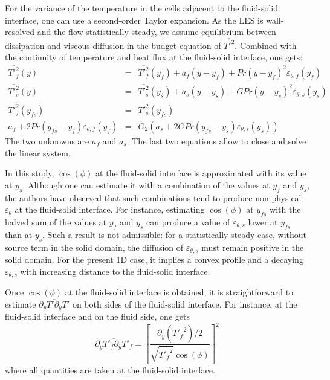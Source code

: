 \documentclass{svjour3}                     %
\begin{document}
For the variance of the temperature in the cells adjacent to the fluid-solid interface, one can use a second-order Taylor expansion.
As the LES is wall-resolved and the flow statistically steady, we assume equilibrium between dissipation and viscous diffusion in the budget equation of $\overline{{T'}^2}$.
Combined with the continuity of temperature and heat flux at the fluid-solid interface, one gets:
\begin{eqnarray}
\overline{{T'}^2_f} \left( y \right) & = & \overline{{T'}^2_f} \left( y_f \right) + a_f \left( y-y_f \right) + Pr \left( y-y_f \right)^2 \varepsilon_{\theta,f} \left( y_f \right) \nonumber \\
\overline{{T'}^2_s} \left( y \right) & = & \overline{{T'}^2_s} \left( y_s \right) + a_s \left( y-y_s \right) + G Pr \left( y-y_s \right)^2 \varepsilon_{\theta,s} \left( y_s \right) \nonumber \\
\overline{{T'}^2_f} \left( y_{fs} \right) & = & \overline{{T'}^2_s} \left( y_{fs} \right) \nonumber \\
a_f + 2 Pr \left( y_{fs}-y_f \right) \varepsilon_{\theta,f} \left( y_f \right) & = & G_2 \left( a_s + 2 G Pr \left( y_{fs}-y_s \right) \varepsilon_{\theta,s} \left( y_s \right) \right)
\end{eqnarray}
The two unknowns are $a_f$ and $a_s$.
The last two equations allow to close and solve the linear system.

In this study, $\cos \left( \phi \right)$ at the fluid-solid interface is approximated with its value at $y_s$.
Although one can estimate it with a combination of the values at $y_f$ and $y_s$, the authors have observed that such combinations tend to produce non-physical $\varepsilon_\theta$ at the fluid-solid interface.
For instance, estimating $\cos \left( \phi \right)$ at $y_{fs}$ with the halved sum of the values at $y_f$ and $y_s$ can produce a value of $\varepsilon_{\theta,s}$ lower at $y_{fs}$ than at $y_s$.
Such a result is not admissible: for a statistically steady case, without source term in the solid domain, the diffusion of $\varepsilon_{\theta,s}$ must remain positive in the solid domain.
For the present 1D case, it implies a convex profile and a decaying $\varepsilon_{\theta,s}$ with increasing distance to the fluid-solid interface.

Once $\cos \left( \phi \right)$ at the fluid-solid interface is obtained, it is straightforward to estimate $\overline{\partial_y T' \partial_y T'}$ on both sides of the fluid-solid interface.
For instance, at the fluid-solid interface and on the fluid side, one gets
\begin{equation}
\label{eq-example_cos_phi}
\overline{\partial_y T'_f \partial_y T'_f}  = \left[ \frac{\partial_y \left( \overline{{T'_f}^2} \right) / 2}{\sqrt{\overline{{T'_f}^2}} \cos \left( \phi \right)} \right]^2
\end{equation}
where all quantities are taken at the fluid-solid interface.
\end{document}
